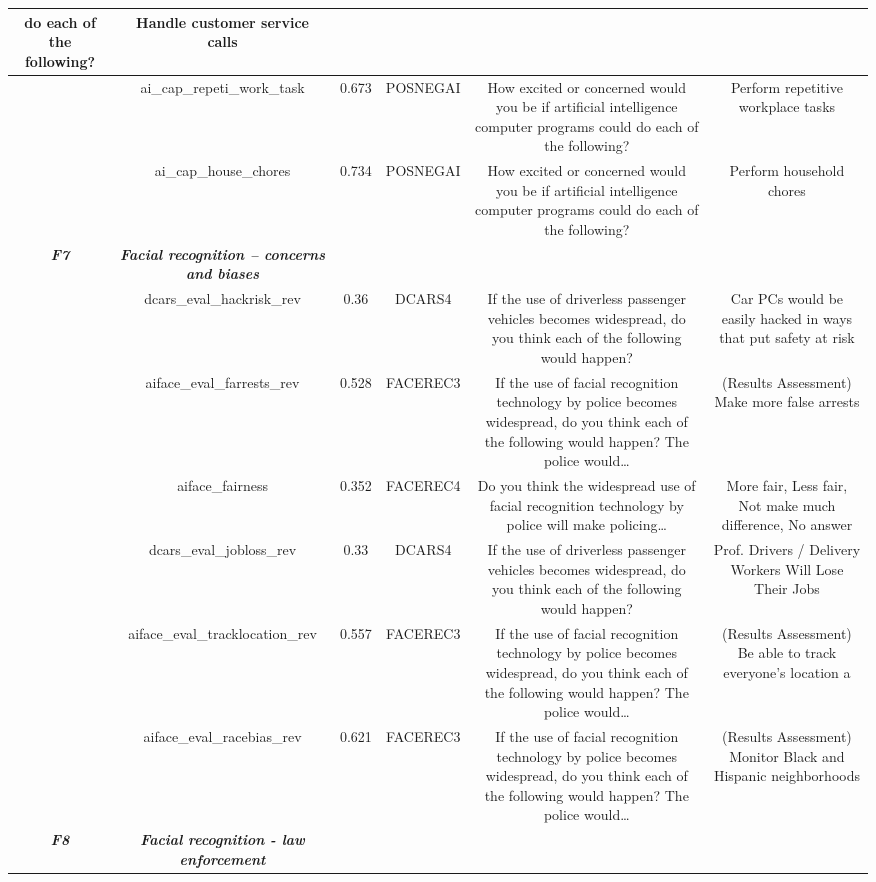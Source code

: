 {\begin{tabular}{c | c | c | c | c | c}
do each of the following? & Handle customer service calls \\
  \hline
   & ai\_cap\_repeti\_work\_task & 0.673 & POSNEGAI & How excited or concerned would you be if artificial intelligence computer programs could
do each of the following? & Perform repetitive workplace tasks \\
  \hline
  \textit{ } & ai\_cap\_house\_chores & 0.734 & POSNEGAI & How excited or concerned would you be if artificial intelligence computer programs could
do each of the following? & Perform household chores \\
  \hline
  \textit{\textbf{F7}} & \textit{\textbf{Facial recognition – concerns and biases}} \\
  \hline
   & dcars\_eval\_hackrisk\_rev & 0.36 & DCARS4 & If the use of driverless passenger vehicles becomes widespread, do you think each of the following would happen? & Car PCs would be easily hacked in ways that put safety at risk \\
  \hline
   & aiface\_eval\_farrests\_rev & 0.528 & FACEREC3 & If the use of facial recognition technology by police becomes widespread, do you think each of the following would happen? The police would… & (Results Assessment) Make more false arrests \\
  \hline
   & aiface\_fairness & 0.352 & FACEREC4 & Do you think the widespread use of facial recognition technology by police will make policing… & More fair, Less fair, Not make much difference, No answer \\
  \hline
   & dcars\_eval\_jobloss\_rev & 0.33 & DCARS4 & If the use of driverless passenger vehicles becomes widespread, do you think each of the following would happen? & Prof. Drivers / Delivery Workers Will Lose Their Jobs \\
  \hline
   & aiface\_eval\_tracklocation\_rev & 0.557 & FACEREC3 & If the use of facial recognition technology by police becomes widespread, do you think each of the following would happen? The police would… & (Results Assessment) Be able to track everyone’s location a \\
  \hline
  \textit{ } & aiface\_eval\_racebias\_rev & 0.621 & FACEREC3 & If the use of facial recognition technology by police becomes widespread, do you think each of the following would happen? The police would… & (Results Assessment) Monitor Black and Hispanic neighborhoods \\
  \hline
  \textit{\textbf{F8}} & \textit{\textbf{Facial recognition - law enforcement}} \\

\end{tabular}}
